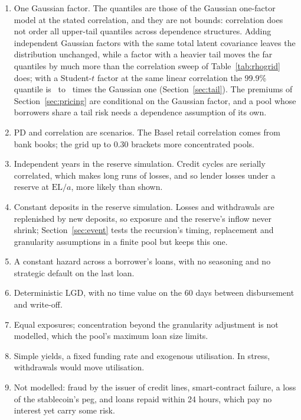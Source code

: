 \documentclass[11pt]{article}
\theoremstyle{plain}
\theoremstyle{definition}
\newcommand{\EL}{\mathrm{EL}}
\begin{document}
\begin{enumerate}
\item One Gaussian factor. The quantiles are those of the Gaussian one-factor model at the stated
  correlation, and they are not bounds: correlation does not order all upper-tail quantiles across
  dependence structures. Adding independent Gaussian factors with the same total latent covariance
  leaves the distribution unchanged, while a factor with a heavier tail moves the far quantiles by
  much more than the correlation sweep of Table~\ref{tab:rhogrid} does; with a Student-$t$ factor at the
  same linear correlation the 99.9\% quantile is \TailTTenRatio\ to \TailTFiveRatio\ times the Gaussian
  one (Section~\ref{sec:tail}). The premiums of Section~\ref{sec:pricing} are conditional on the
  Gaussian factor, and a pool whose borrowers share a tail risk needs a dependence assumption of its own.
\item PD and correlation are scenarios. The Basel retail correlation comes from bank books; the grid up
  to 0.30 brackets more concentrated pools.
\item Independent years in the reserve simulation. Credit cycles are serially correlated, which makes
  long runs of losses, and so lender losses under a reserve at $\EL/a$, more likely than shown.
\item Constant deposits in the reserve simulation. Losses and withdrawals are replenished by new
  deposits, so exposure and the reserve's inflow never shrink; Section~\ref{sec:event} tests the
  recursion's timing, replacement and granularity assumptions in a finite pool but keeps this one.
\item A constant hazard across a borrower's loans, with no seasoning and no strategic default on the
  last loan.
\item Deterministic LGD, with no time value on the 60 days between disbursement and write-off.
\item Equal exposures; concentration beyond the granularity adjustment is not modelled, which the
  pool's maximum loan size limits.
\item Simple yields, a fixed funding rate and exogenous utilisation. In stress, withdrawals would move
  utilisation.
\item Not modelled: fraud by the issuer of credit lines, smart-contract failure, a loss of the
  stablecoin's peg, and loans repaid within 24 hours, which pay no interest yet carry some risk.
\end{enumerate}
\end{document}
